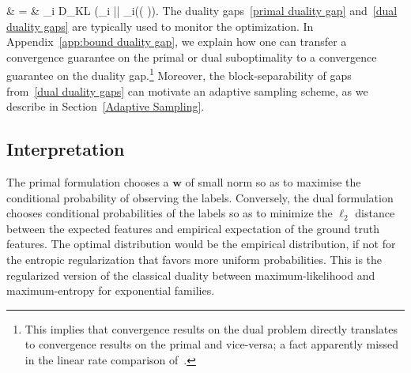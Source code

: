 	& = & \sum_i D_{KL} (\alpha_i || \hat{ \alpha}_i(( \balpha)).
\eeqa
The duality gaps~\eqref{primal duality gap}  and~\eqref{dual duality gaps} are typically used to monitor the optimization.
In Appendix~\ref{app:bound duality gap}, we explain how one can transfer a convergence guarantee on the primal or dual suboptimality to a convergence guarantee on the duality gap.\footnote{
    This implies that convergence results on the dual problem directly translates to convergence results on the primal and vice-versa;
     a fact apparently missed in the linear rate comparison of~\citet{schmidt2015non}.
}
Moreover, the block-separability of gaps from~\eqref{dual duality gaps} can motivate an adaptive sampling scheme, as we describe in Section~\ref{Adaptive Sampling}.

\subsection{Interpretation}
The primal formulation chooses a $\bm{w}$ of small norm so as to maximise the conditional probability of observing the labels.
Conversely, the  dual formulation chooses conditional probabilities of the labels so as to minimize the $\ell_2$ distance between the expected features and empirical expectation of the ground truth features.
The optimal distribution would be the empirical  distribution, if not for the entropic regularization that favors more uniform probabilities.
This is the regularized version of the classical duality between maximum-likelihood and maximum-entropy for exponential families.

